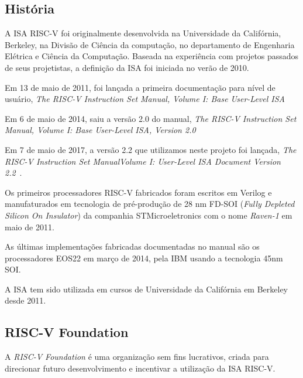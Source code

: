 	\subsection{História}%
		A ISA RISC-V foi originalmente desenvolvida na Universidade da Califórnia, Berkeley, na Divisão de Ciência da computação, no departamento de Engenharia Elétrica e Ciência da Computação. Baseada na experiência com projetos passados de seus projetistas, a definição da ISA foi iniciada no verão de 2010.\

		Em 13 de maio de 2011, foi lançada a primeira documentação para nível de usuário, \textit{The RISC-V Instruction Set Manual, Volume I: Base User-Level ISA} ~\cite{riscv_manual_v1}

		Em 6 de maio de 2014, saiu a versão 2.0 do manual, \textit{The RISC-V Instruction Set Manual, Volume I: Base User-Level ISA, Version 2.0} ~\cite{riscv_manual_v2}

		Em 7 de maio de 2017, a versão 2.2 que utilizamos neste projeto foi lançada, \textit{The RISC-V Instruction Set ManualVolume I: User-Level ISA Document Version 2.2}~\cite{riscv_spec}.

		Os primeiros processadores RISC-V fabricados foram escritos em Verilog e manufaturados em tecnologia de pré-produção de 28 nm FD-SOI (\textit{Fully Depleted Silicon On Insulator}) da companhia STMicroeletronics com o nome \textit{Raven-1} em maio de 2011.

		As últimas implementações fabricadas documentadas no manual são os processadores EOS22 em março de 2014, pela IBM usando a tecnologia 45nm SOI.

		A ISA tem sido utilizada em cursos de Universidade da Califórnia em Berkeley desde 2011.


	

	\subsection{RISC-V Foundation}
		
		A \textit{RISC-V Foundation} é uma organização sem fins lucrativos, criada para direcionar futuro desenvolvimento e incentivar a utilização da ISA RISC-V.\ ~\cite{riscv_foundation} 


